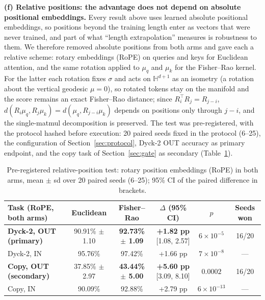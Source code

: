 \documentclass[11pt]{article}
\begin{document}
\textbf{(f) Relative positions: the advantage does not depend on absolute positional embeddings.} Every result above uses learned absolute positional embeddings, so positions beyond the training length enter as vectors that were never trained, and part of what ``length extrapolation'' measures is robustness to them. We therefore removed absolute positions from both arms and gave each a relative scheme: rotary embeddings (RoPE) \cite{su2021roformer} on queries and keys for Euclidean attention, and the same rotation applied to $\mu_q$ and $\mu_k$ for the Fisher--Rao kernel. For the latter each rotation fixes $\sigma$ and acts on $\mathbb{H}^{d+1}$ as an isometry (a rotation about the vertical geodesic $\mu = 0$), so rotated tokens stay on the manifold and the score remains an exact Fisher--Rao distance; since $R_i^{\top}R_j = R_{j-i}$, $d(R_i\mu_q, R_j\mu_k) = d(\mu_q, R_{j-i}\mu_k)$ depends on positions only through $j - i$, and the single-matmul decomposition is preserved. The test was pre-registered, with the protocol hashed before execution: 20 paired seeds fixed in the protocol (6--25), the configuration of Section~\ref{sec:protocol}, Dyck-2 OUT accuracy as primary endpoint, and the copy task of Section~\ref{sec:gate} as secondary (Table~\ref{tab:rope}).

\begin{table}[h]
\centering\footnotesize
\setlength{\tabcolsep}{4pt}
\begin{tabular}{lccccc}
\toprule
Task (RoPE, both arms) & Euclidean & Fisher--Rao & $\Delta$ (95\% CI) & $p$ & Seeds won \\
\midrule
\textbf{Dyck-2, OUT (primary)} & 90.91\% $\pm$ 1.10 & \textbf{92.73\% $\pm$ 1.09} & \textbf{+1.82 pp} [1.08, 2.57] & $6\times10^{-5}$ & 16/20 \\
Dyck-2, IN & 95.76\% & 97.42\% & +1.66 pp & $7\times10^{-8}$ & --- \\
\textbf{Copy, OUT (secondary)} & 37.85\% $\pm$ 2.97 & \textbf{43.44\% $\pm$ 5.00} & \textbf{+5.60 pp} [3.09, 8.10] & $0.0002$ & 16/20 \\
Copy, IN & 90.09\% & 92.88\% & +2.79 pp & $6\times10^{-13}$ & --- \\
\bottomrule
\end{tabular}
\caption{Pre-registered relative-position test: rotary position embeddings (RoPE) in both arms, mean $\pm$ sd over 20 paired seeds (6--25); 95\% CI of the paired difference in brackets.}
\label{tab:rope}
\end{table}
\end{document}
